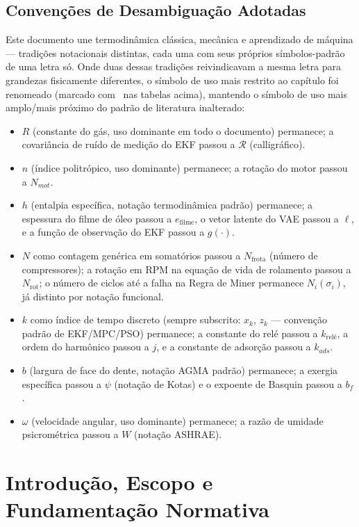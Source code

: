 \documentclass[12pt,a4paper]{article}
\numberwithin{equation}{section}
\numberwithin{table}{section}
\numberwithin{figure}{section}
\begin{document}
\subsection*{Convenções de Desambiguação Adotadas}
Este documento une termodinâmica clássica, mecânica e aprendizado de máquina — tradições notacionais distintas, cada uma com seus próprios símbolos-padrão de uma letra só. Onde duas dessas tradições reivindicavam a mesma letra para grandezas fisicamente diferentes, o símbolo de uso mais restrito ao capítulo foi renomeado (marcado com \dag\ nas tabelas acima), mantendo o símbolo de uso mais amplo/mais próximo do padrão de literatura inalterado:
\begin{itemize}
	\item $R$ (constante do gás, uso dominante em todo o documento) permanece; a covariância de ruído de medição do EKF passou a $\mathcal{R}$ (calligráfico).
	\item $n$ (índice politrópico, uso dominante) permanece; a rotação do motor passou a $N_{mot}$.
	\item $h$ (entalpia específica, notação termodinâmica padrão) permanece; a espessura do filme de óleo passou a $e_{\text{filme}}$, o vetor latente do VAE passou a $\ell$, e a função de observação do EKF passou a $g(\cdot)$.
	\item $N$ como contagem genérica em somatórios passou a $N_{\text{frota}}$ (número de compressores); a rotação em RPM na equação de vida de rolamento passou a $N_{\text{rot}}$; o número de ciclos até a falha na Regra de Miner permanece $N_i(\sigma_i)$, já distinto por notação funcional.
	\item $k$ como índice de tempo discreto (sempre subscrito: $x_k$, $z_k$ — convenção padrão de EKF/MPC/PSO) permanece; a constante do relé passou a $k_{\text{relé}}$, a ordem do harmônico passou a $j$, e a constante de adsorção passou a $k_{ads}$.
	\item $b$ (largura de face do dente, notação AGMA padrão) permanece; a exergia específica passou a $\psi$ (notação de Kotas) e o expoente de Basquin passou a $b_f$.
	\item $\omega$ (velocidade angular, uso dominante) permanece; a razão de umidade psicrométrica passou a $W$ (notação ASHRAE).
\end{itemize}

\newpage



	
	
	\section{\textbf{Introdução, Escopo e Fundamentação Normativa}}
	
\end{document}
